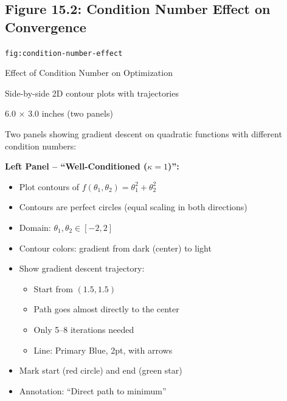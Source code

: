 \documentclass[12pt]{article}
\begin{document}
\newpage

\subsection{Figure 15.2: Condition Number Effect on Convergence}

\begin{description}[style=nextline, leftmargin=0pt]
    \item[Figure ID] \texttt{fig:condition-number-effect}
    \item[Title] Effect of Condition Number on Optimization
    \item[Type] Side-by-side 2D contour plots with trajectories
    \item[Size] 6.0 $\times$ 3.0 inches (two panels)

    \item[Visual Description]
    Two panels showing gradient descent on quadratic functions with different condition numbers:

    \textbf{Left Panel -- ``Well-Conditioned ($\kappa = 1$)'':}
    \begin{itemize}
        \item Plot contours of $f(\theta_1, \theta_2) = \theta_1^2 + \theta_2^2$
        \item Contours are perfect circles (equal scaling in both directions)
        \item Domain: $\theta_1, \theta_2 \in [-2, 2]$
        \item Contour colors: gradient from dark (center) to light
        \item Show gradient descent trajectory:
        \begin{itemize}
            \item Start from $(1.5, 1.5)$
            \item Path goes almost directly to the center
            \item Only 5--8 iterations needed
            \item Line: Primary Blue, 2pt, with arrows
        \end{itemize}
        \item Mark start (red circle) and end (green star)
        \item Annotation: ``Direct path to minimum''
    \end{itemize}


\end{description}
\end{document}
